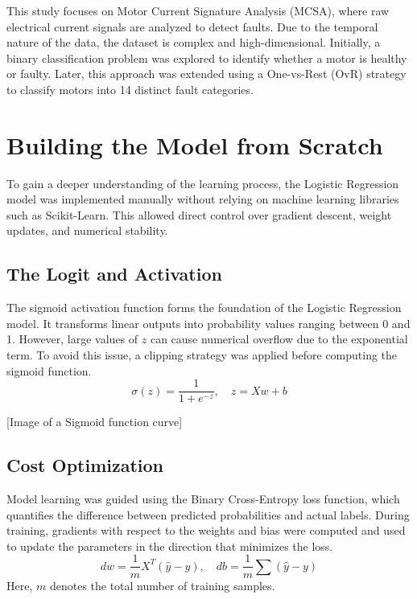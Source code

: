 \documentclass[conference]{IEEEtran}
\begin{document}
This study focuses on Motor Current Signature Analysis (MCSA), where raw electrical current signals are analyzed to detect faults. Due to the temporal nature of the data, the dataset is complex and high-dimensional. Initially, a binary classification problem was explored to identify whether a motor is healthy or faulty. Later, this approach was extended using a One-vs-Rest (OvR) strategy to classify motors into 14 distinct fault categories.

\section{Building the Model from Scratch}
To gain a deeper understanding of the learning process, the Logistic Regression model was implemented manually without relying on machine learning libraries such as Scikit-Learn. This allowed direct control over gradient descent, weight updates, and numerical stability.

\subsection{The Logit and Activation}
The sigmoid activation function forms the foundation of the Logistic Regression model. It transforms linear outputs into probability values ranging between 0 and 1. However, large values of $z$ can cause numerical overflow due to the exponential term. To avoid this issue, a clipping strategy was applied before computing the sigmoid function.
\begin{equation}
\sigma(z) = \frac{1}{1 + e^{-z}}, \quad z = Xw + b
\end{equation}

[Image of a Sigmoid function curve]

\subsection{Cost Optimization}
Model learning was guided using the Binary Cross-Entropy loss function, which quantifies the difference between predicted probabilities and actual labels. During training, gradients with respect to the weights and bias were computed and used to update the parameters in the direction that minimizes the loss.
\begin{equation}
dw = \frac{1}{m} X^T (\hat{y} - y), \quad db = \frac{1}{m} \sum (\hat{y} - y)
\end{equation}
Here, $m$ denotes the total number of training samples.
\end{document}
